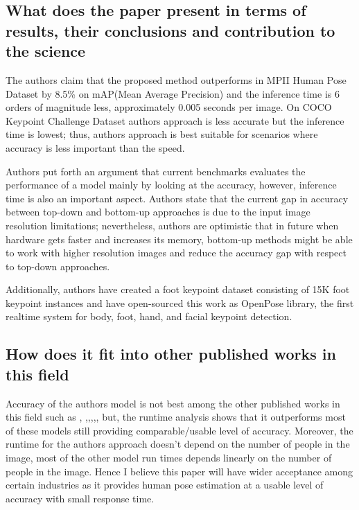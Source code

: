 \documentclass[twocolumn]{article}
\begin{document}
\subsection{What does the paper present in terms of results, their conclusions and contribution to the science}
The authors claim that the proposed method outperforms \cite{insafutdinov2016deepercut} in MPII Human Pose Dataset\cite{andriluka20142d} by 8.5\% on mAP(Mean Average Precision) and the inference time is 6 orders of magnitude less, approximately 0.005 seconds per image. On COCO Keypoint Challenge Dataset\cite{lin2014microsoft} authors approach is less accurate but the inference time is lowest; thus, authors approach is best suitable for scenarios where accuracy is less important than the speed. 

Authors put forth an argument that current benchmarks evaluates the performance of a model mainly by looking at the accuracy, however, inference time is also an important aspect. Authors state that the current gap in accuracy between top-down and bottom-up approaches is due to the input image resolution limitations; nevertheless, authors are optimistic that in future when hardware gets faster and increases its memory, bottom-up methods might be able to work with higher resolution images and reduce the accuracy gap with respect to top-down approaches. 

Additionally, authors have created a foot keypoint dataset consisting of 15K foot keypoint instances and have open-sourced this work as OpenPose library, the first realtime system for body, foot, hand, and facial keypoint detection.

\subsection{How does it fit into other published works in this field}
Accuracy of the authors model is not best among the other published works in this field such as \cite{he2017mask}, \cite{fang2017rmpe},\cite{chen2018cascaded},\cite{xiao2018simple},\cite{newell2017associative},\cite{fieraru2018learning}, but, the runtime analysis shows that it outperforms most of these models still providing comparable/usable level of accuracy. Moreover, the runtime for the authors approach doesn't depend on the number of people in the image, most of the other model run times depends linearly on the number of people in the image. Hence I believe this paper will have wider acceptance among certain industries as it provides human pose estimation at a usable level of accuracy with small response time.
\end{document}
